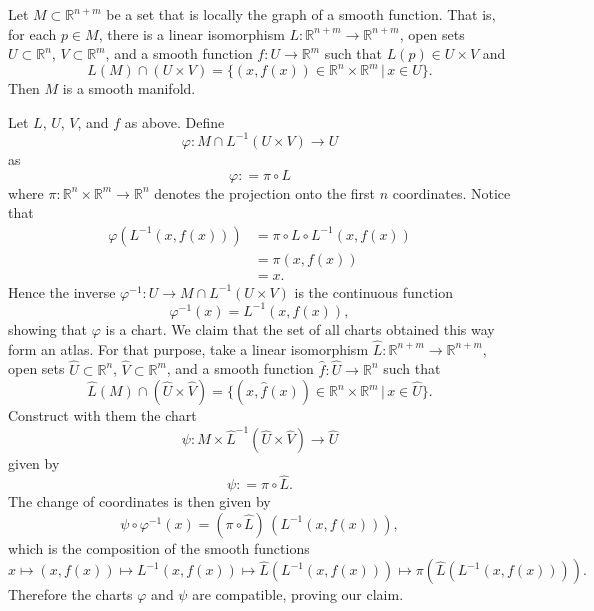 \documentclass{ximera}
\begin{document}
\begin{example} \label{ex:local-graph} Let $M\subset \mathbb{R}^{n+m}$ be a set that is locally the graph of a smooth function. That is, for each $p \in M$, there is a linear isomorphism $L : \mathbb{R}^{n+m} \to \mathbb{R}^{n+m}$, open sets $U \subset \mathbb{R}^n $, $V \subset \mathbb{R}^m$, and a smooth function $f : U \to \mathbb{R}^m$ such that $L(p) \in U\times V$ and
\[      L (M) \cap ( U \times V  ) = \{ (x,f(x)) \in \mathbb{R}^n \times \mathbb{R}^m  \, \vert \,  x \in U \}  . \]
Then $M$ is a smooth manifold. 



\begin{solution}
    Let $L $, $U$, $V$, and $f$ as above. Define
    \[ \varphi  : M  \cap L^{-1} (U \times V) \to U \]
    as 
    \[  \varphi : = \pi \circ L             \]
    where $\pi  : \mathbb{R}^n \times \mathbb{R}^m \to \mathbb{R}^n$ denotes the projection onto the first $n$ coordinates.  Notice that  
    \begin{align*}
        \varphi (L^{-1} (x, f(x))) & = \pi \circ L \circ L^{-1} (x, f(x)) \\
        & = \pi (x, f(x)) \\
        & = x .
    \end{align*}
     Hence the inverse $\varphi^{-1} : U \to M \cap L^{-1} (U \times V)$ is the continuous function  
    \[ \varphi  ^{-1} (x) =  L ^{-1} (x, f(x)) ,  \]
    showing that $\varphi$ is a chart. We claim that the set of all charts obtained this way form an atlas. For that purpose, take a linear isomorphism $ \hat{L} : \mathbb{R}^{n+m} \to \mathbb{R}^{n+m}$, open sets $\hat{U} \subset \mathbb{R}^n $, $\hat{V} \subset \mathbb{R}^m$, and a smooth function $\hat{f} : \hat{U} \to \mathbb{R}^n$ such that 
    \[      \hat{L} (M) \cap ( \hat{U} \times \hat{ V}  ) = \{ (x,\hat{f}(x)) \in \mathbb{R}^n \times \mathbb{R}^m  \, \vert \,  x \in \hat{U} \}  . \]
    Construct with them the chart 
    \[             \psi : M \times \hat{L}^{-1} (\hat{U}  \times \hat{V} ) \to \hat{U}                            \]
    given by 
    \[     \psi : = \pi \circ \hat{L} .     \]
    The change of coordinates is then given by
    \[         \psi \circ \varphi ^{-1} (x) = ( \pi \circ \hat{L} ) \, ( L ^{-1} (  x, f( x )  ) )  ,                                     \]
    which is the composition of the smooth functions
    \[       x \mapsto ( x, f(x) ) \mapsto L ^{-1} (x, f(x)) \mapsto \hat{L} ( L ^{-1} (x,f(x)) ) \mapsto \pi (  \hat{L}  ( L^{-1}  (x, f(x))  )  ).                            \]
    Therefore the charts $\varphi$ and $\psi $ are compatible, proving our claim. 
    \end{solution}
\end{example}
\end{document}
